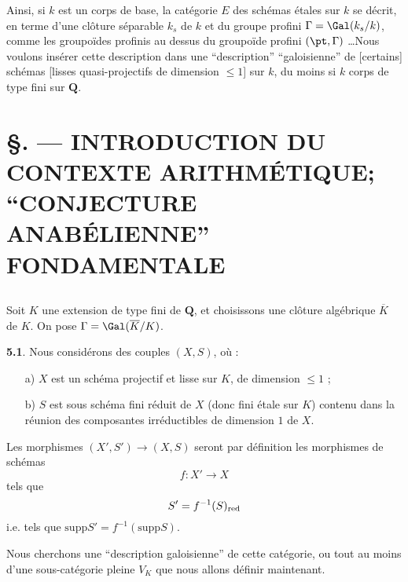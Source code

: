 Ainsi, si $k$ est un corps de base, la catégorie $E$ des schémas étales sur $k$ se décrit, en terme d'une
clôture séparable $k_s$ de $k$ et du groupe profini $\Gamma = \Gal(k_s/k)$, comme les groupoïdes profinis 
au dessus du groupoïde profini $(\pt, \Gamma)$ \dots Nous voulons insérer cette description dans une 
``description'' ``galoisienne'' de [certains] schémas [lisses quasi-projectifs de dimension $\leq 1$]
sur $k$, du moins si $k$ corps de type fini sur $\mathbf{Q}$.
















\chapter*{\S {}. --- INTRODUCTION DU CONTEXTE ARITHMÉTIQUE; ``CONJECTURE ANABÉLIENNE'' FONDAMENTALE}\thispagestyle{empty}
\label{sec:5}
\section*{}

Soit $K$ une extension de type fini de $\mathbf{Q}$, et choisissons une clôture algébrique $\overline{K}$ de $K$. On pose $\Gamma = \Gal(\overline{K}/K)$.

{\bf 5.1}. Nous considérons des couples $(X, S)$, où :
\begin{enumerate}
    \item[a)] $X$ est un schéma projectif et lisse sur $K$, de dimension $\leq 1$ ;
    \item[b)] $S$ est sous schéma fini réduit de $X$ (donc fini étale sur $K$) contenu dans la réunion
    des composantes irréductibles de dimension $1$ de $X$.
\end{enumerate}

Les morphismes $(X', S') \to (X, S)$ seront par définition les morphismes de schémas
$$
f: X' \to X
$$
tels que
$$
S' = f^{-1}(S)_{\text{\text{red}}}
$$
i.e. tels que $\text{supp} S' = f^{-1}(\text{supp} S)$.

Nous cherchons une ``description galoisienne'' de cette catégorie, ou tout au moins d'une 
sous-catégorie pleine $V_K$ que nous allons définir maintenant.

